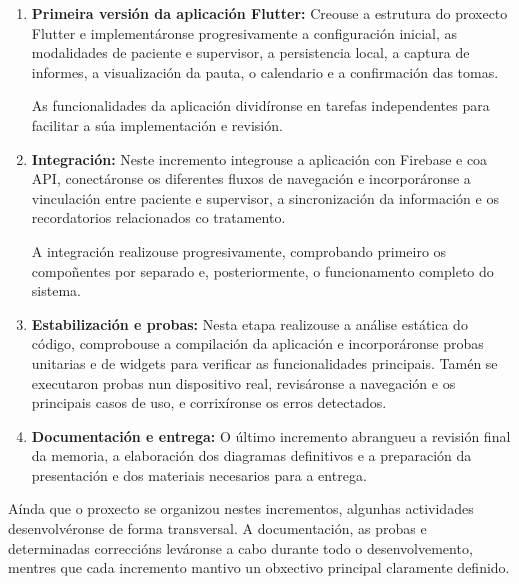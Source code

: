 \begin{enumerate}
    \item \textbf{Primeira versión da aplicación Flutter:} Creouse a estrutura do proxecto Flutter e implementáronse progresivamente a configuración inicial, as modalidades de paciente e supervisor, a persistencia local, a captura de informes, a visualización da pauta, o calendario e a confirmación das tomas.

    As funcionalidades da aplicación dividíronse en tarefas independentes para facilitar a súa implementación e revisión.

    \item \textbf{Integración:}   Neste incremento integrouse a aplicación con Firebase e coa API, conectáronse os diferentes fluxos de navegación e incorporáronse a vinculación entre paciente e supervisor, a sincronización da información e os recordatorios relacionados co tratamento.
    
    A integración realizouse progresivamente, comprobando primeiro os compoñentes por separado e, posteriormente, o funcionamento completo do sistema.

    \item \textbf{Estabilización e probas:} Nesta etapa realizouse a análise estática do código, comprobouse a compilación da aplicación e incorporáronse probas unitarias e de widgets para verificar as funcionalidades principais. Tamén se executaron probas nun dispositivo real, revisáronse a navegación e os principais casos de uso, e corrixíronse os erros detectados.

    \item  \textbf{Documentación e entrega:} O último incremento abrangueu a revisión final da memoria, a elaboración dos diagramas definitivos e a preparación da presentación e dos materiais necesarios para a entrega.

\end{enumerate}

Aínda que o proxecto se organizou nestes incrementos, algunhas actividades desenvolvéronse de forma transversal. A documentación, as probas e determinadas correccións leváronse a cabo durante todo o desenvolvemento, mentres que cada incremento mantivo un obxectivo principal claramente definido.

